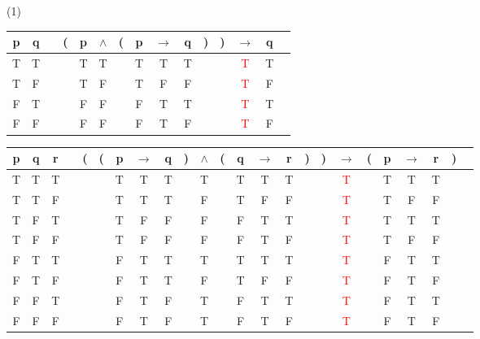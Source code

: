 \begin{Solution}{2.3}
\quad
    \begin{tasks}(1)
        \task
		\begin{tabular}{@{ }c@{ }@{ }c | c@{ }@{}c@{}@{ }c@{ }@{ }c@{ }@{}c@{}@{ }c@{ }@{ }c@{ }@{ }c@{ }@{}c@{}@{}c@{}@{ }c@{ }@{ }c@{ }@{ }c}
		p & q &  & ( & p & $\land $ & ( & p & $\rightarrow$ & q & ) & ) & $\rightarrow$ & q & \\
		\hline
		T & T &  &  & T & T &  & T & T & T &  &  & \textcolor{red}{T} & T & \\
		T & F &  &  & T & F &  & T & F & F &  &  & \textcolor{red}{T} & F & \\
		F & T &  &  & F & F &  & F & T & T &  &  & \textcolor{red}{T} & T & \\
		F & F &  &  & F & F &  & F & T & F &  &  & \textcolor{red}{T} & F & \\
		\end{tabular}

        \task
		\begin{tabular}{@{ }c@{ }@{ }c@{ }@{ }c | c@{ }@{}c@{}@{}c@{}@{ }c@{ }@{ }c@{ }@{ }c@{ }@{}c@{}@{ }c@{ }@{}c@{}@{ }c@{ }@{ }c@{ }@{ }c@{ }@{}c@{}@{}c@{}@{ }c@{ }@{}c@{}@{ }c@{ }@{ }c@{ }@{ }c@{ }@{}c@{}@{ }c}
		p & q & r &  & ( & ( & p & $\rightarrow$ & q & ) & $\land $ & ( & q & $\rightarrow$ & r & ) & ) & $\rightarrow$ & ( & p & $\rightarrow$ & r & ) & \\
		\hline
		T & T & T &  &  &  & T & T & T &  & T &  & T & T & T &  &  & \textcolor{red}{T} &  & T & T & T &  & \\
		T & T & F &  &  &  & T & T & T &  & F &  & T & F & F &  &  & \textcolor{red}{T} &  & T & F & F &  & \\
		T & F & T &  &  &  & T & F & F &  & F &  & F & T & T &  &  & \textcolor{red}{T} &  & T & T & T &  & \\
		T & F & F &  &  &  & T & F & F &  & F &  & F & T & F &  &  & \textcolor{red}{T} &  & T & F & F &  & \\
		F & T & T &  &  &  & F & T & T &  & T &  & T & T & T &  &  & \textcolor{red}{T} &  & F & T & T &  & \\
		F & T & F &  &  &  & F & T & T &  & F &  & T & F & F &  &  & \textcolor{red}{T} &  & F & T & F &  & \\
		F & F & T &  &  &  & F & T & F &  & T &  & F & T & T &  &  & \textcolor{red}{T} &  & F & T & T &  & \\
		F & F & F &  &  &  & F & T & F &  & T &  & F & T & F &  &  & \textcolor{red}{T} &  & F & T & F &  & \\
		\end{tabular}


\end{tasks}
\end{Solution}
